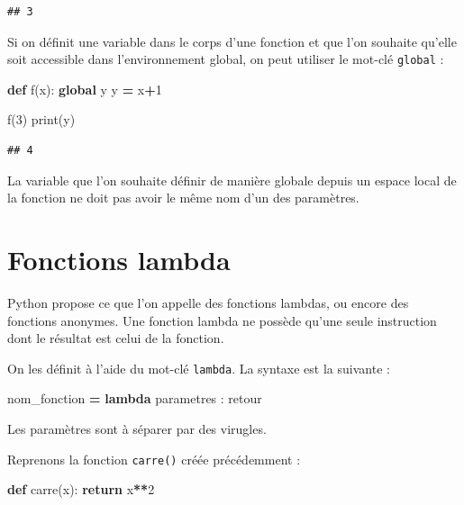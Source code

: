\documentclass[12pt,]{book}
\newenvironment{Shaded}{\begin{snugshade}}{\end{snugshade}}
\newcommand{\KeywordTok}[1]{\textcolor[rgb]{0.13,0.29,0.53}{\textbf{#1}}}
\newcommand{\DecValTok}[1]{\textcolor[rgb]{0.00,0.00,0.81}{#1}}
\newcommand{\ControlFlowTok}[1]{\textcolor[rgb]{0.13,0.29,0.53}{\textbf{#1}}}
\newcommand{\OperatorTok}[1]{\textcolor[rgb]{0.81,0.36,0.00}{\textbf{#1}}}
\newcommand{\BuiltInTok}[1]{#1}
\newcommand{\NormalTok}[1]{#1}
\numberwithin{equation}{section}
\numberwithin{countremarque}{section}
\let\BeginKnitrBlock\begin \let\EndKnitrBlock\end
\begin{document}
\begin{lstlisting}
## 3
\end{lstlisting}

Si on définit une variable dans le corps d'une fonction et que l'on
souhaite qu'elle soit accessible dans l'environnement global, on peut
utiliser le mot-clé \texttt{global} :

\begin{Shaded}
\begin{Highlighting}[]
\KeywordTok{def}\NormalTok{ f(x):}
  \KeywordTok{global}\NormalTok{ y}
\NormalTok{  y }\OperatorTok{=}\NormalTok{ x}\OperatorTok{+}\DecValTok{1}

\NormalTok{f(}\DecValTok{3}\NormalTok{)}
\BuiltInTok{print}\NormalTok{(y)}
\end{Highlighting}
\end{Shaded}

\begin{lstlisting}
## 4
\end{lstlisting}

\BeginKnitrBlock{remarque}
La variable que l'on souhaite définir de manière globale depuis un
espace local de la fonction ne doit pas avoir le même nom d'un des
paramètres.
\EndKnitrBlock{remarque}

\section{Fonctions lambda}\label{fonctions-lambda}

Python propose ce que l'on appelle des fonctions lambdas, ou encore des
fonctions anonymes. Une fonction lambda ne possède qu'une seule
instruction dont le résultat est celui de la fonction.

On les définit à l'aide du mot-clé \texttt{lambda}. La syntaxe est la
suivante :

\begin{Shaded}
\begin{Highlighting}[]
\NormalTok{nom_fonction }\OperatorTok{=} \KeywordTok{lambda}\NormalTok{ parametres : retour}
\end{Highlighting}
\end{Shaded}

Les paramètres sont à séparer par des virugles.

Reprenons la fonction \texttt{carre()} créée précédemment :

\begin{Shaded}
\begin{Highlighting}[]
\KeywordTok{def}\NormalTok{ carre(x):}
  \ControlFlowTok{return}\NormalTok{ x}\OperatorTok{**}\DecValTok{2}
\end{Highlighting}
\end{Shaded}
\end{document}
